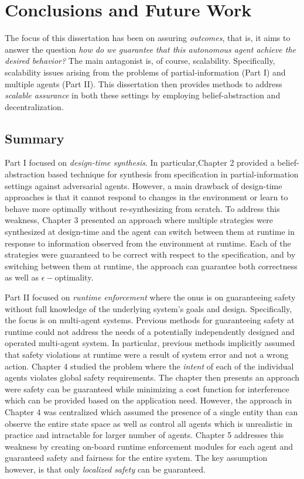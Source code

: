 \chapter{Conclusions and Future Work}
The focus of this dissertation has been on assuring \emph{outcomes}, that is, it aims to answer the question \emph{how do we guarantee that this autonomous agent achieve the desired behavior?} The main antagonist is, of course, scalability. Specifically, scalability issues arising from the problems of partial-information (Part I) and multiple agents (Part II). This dissertation then provides methods to address \emph{scalable assurance} in both these settings by employing belief-abstraction and decentralization. 

\section{Summary}
Part I focused on \emph{design-time synthesis}. In particular,Chapter 2 provided a belief-abstraction based technique for synthesis from specification in partial-information settings against adversarial agents. However, a main drawback of design-time approaches is that it cannot respond to changes in the environment or learn to behave more optimally without re-synthesizing from scratch. To address this weakness, Chapter 3 presented an approach where multiple strategies were synthesized at design-time and the agent can switch between them at runtime in response to information observed from the environment at runtime. Each of the strategies were guaranteed to be correct with respect to the specification, and by switching between them at runtime, the approach can guarantee both correctness as well as $\epsilon-$optimality. 

Part II focused on \emph{runtime enforcement} where the onus is on guaranteeing safety without full knowledge of the underlying system's goals and design. Specifically, the focus is on multi-agent systems. Previous methods for guaranteeing safety at runtime could not address the needs of a potentially independently designed and operated multi-agent system. In particular, previous methods implicitly assumed that safety violations at runtime were a result of system error and not a wrong action. Chapter 4 studied the problem where the \emph{intent} of each of the individual agents violates global safety requirements. The chapter then presents an approach were safety can be guaranteed while minimizing a cost function for interference which can be provided based on the application need. However, the approach in Chapter 4 was centralized which assumed the presence of a single entity than can observe the entire state space as well as control all agents which is unrealistic in practice and intractable for larger number of agents. Chapter 5 addresses this weakness by creating on-board runtime enforcement modules for each agent and guaranteed safety and fairness for the entire system. The key assumption however, is that only \emph{localized safety} can be guaranteed. 

